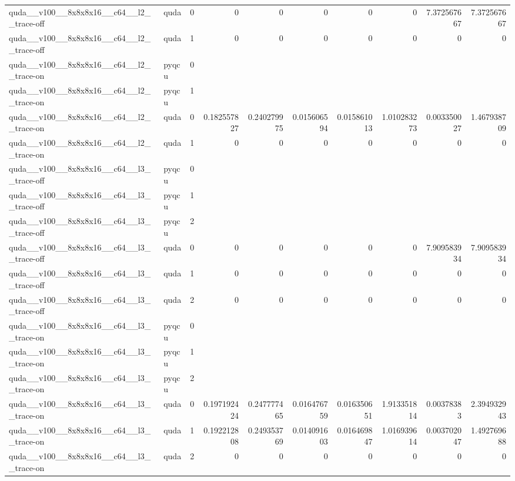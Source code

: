 \begin{table}[htbp]
\begin{tabular}{@{}llrrrrrrrr@{}}
quda\_\_v100\_\_8x8x8x16\_\_c64\_\_l2\_\_trace-off & quda & 0 & 0 & 0 & 0 & 0 & 0 & 7.372567667 & 7.372567667 \\
quda\_\_v100\_\_8x8x8x16\_\_c64\_\_l2\_\_trace-off & quda & 1 & 0 & 0 & 0 & 0 & 0 & 0 & 0 \\
quda\_\_v100\_\_8x8x8x16\_\_c64\_\_l2\_\_trace-on & pyqcu & 0 &  &  &  &  &  &  &  \\
quda\_\_v100\_\_8x8x8x16\_\_c64\_\_l2\_\_trace-on & pyqcu & 1 &  &  &  &  &  &  &  \\
quda\_\_v100\_\_8x8x8x16\_\_c64\_\_l2\_\_trace-on & quda & 0 & 0.182557827 & 0.240279975 & 0.015606594 & 0.015861013 & 1.010283273 & 0.003350027 & 1.467938709 \\
quda\_\_v100\_\_8x8x8x16\_\_c64\_\_l2\_\_trace-on & quda & 1 & 0 & 0 & 0 & 0 & 0 & 0 & 0 \\
quda\_\_v100\_\_8x8x8x16\_\_c64\_\_l3\_\_trace-off & pyqcu & 0 &  &  &  &  &  &  &  \\
quda\_\_v100\_\_8x8x8x16\_\_c64\_\_l3\_\_trace-off & pyqcu & 1 &  &  &  &  &  &  &  \\
quda\_\_v100\_\_8x8x8x16\_\_c64\_\_l3\_\_trace-off & pyqcu & 2 &  &  &  &  &  &  &  \\
quda\_\_v100\_\_8x8x8x16\_\_c64\_\_l3\_\_trace-off & quda & 0 & 0 & 0 & 0 & 0 & 0 & 7.909583934 & 7.909583934 \\
quda\_\_v100\_\_8x8x8x16\_\_c64\_\_l3\_\_trace-off & quda & 1 & 0 & 0 & 0 & 0 & 0 & 0 & 0 \\
quda\_\_v100\_\_8x8x8x16\_\_c64\_\_l3\_\_trace-off & quda & 2 & 0 & 0 & 0 & 0 & 0 & 0 & 0 \\
quda\_\_v100\_\_8x8x8x16\_\_c64\_\_l3\_\_trace-on & pyqcu & 0 &  &  &  &  &  &  &  \\
quda\_\_v100\_\_8x8x8x16\_\_c64\_\_l3\_\_trace-on & pyqcu & 1 &  &  &  &  &  &  &  \\
quda\_\_v100\_\_8x8x8x16\_\_c64\_\_l3\_\_trace-on & pyqcu & 2 &  &  &  &  &  &  &  \\
quda\_\_v100\_\_8x8x8x16\_\_c64\_\_l3\_\_trace-on & quda & 0 & 0.197192424 & 0.247777465 & 0.016476759 & 0.016350651 & 1.913351814 & 0.00378383 & 2.394932943 \\
quda\_\_v100\_\_8x8x8x16\_\_c64\_\_l3\_\_trace-on & quda & 1 & 0.192212808 & 0.249353769 & 0.014091603 & 0.016469847 & 1.016939614 & 0.003702047 & 1.492769688 \\
quda\_\_v100\_\_8x8x8x16\_\_c64\_\_l3\_\_trace-on & quda & 2 & 0 & 0 & 0 & 0 & 0 & 0 & 0 \\
\bottomrule
\end{tabular}
\end{table}

